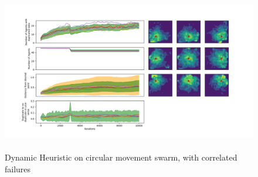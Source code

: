 \documentclass{UoYCSproject}
\begin{document}
\begin{figure}[htb]
\label{fig:circle_movement_con2}
\begin{center}
\centering
\includegraphics[height=7cm]{"./Dynamic_Heuristic/Circle_move_con.png"}
\caption{Dynamic Heuristic on circular movement swarm, with correlated failures}
\end{center}
\end{figure}
\end{document}
